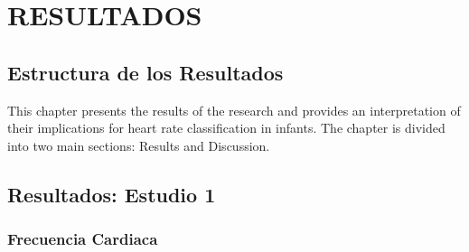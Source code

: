 \section{RESULTADOS}\label{cap:results}

\subsection{Estructura de los Resultados}\label{sec:results}

This chapter presents the results of the research and provides an interpretation of their implications for heart rate classification in infants. The chapter is divided into two main sections: Results and Discussion.

\subsection{Resultados: Estudio 1}\label{sec:resultados-estudio-1}

\subsubsection{Frecuencia Cardiaca}

